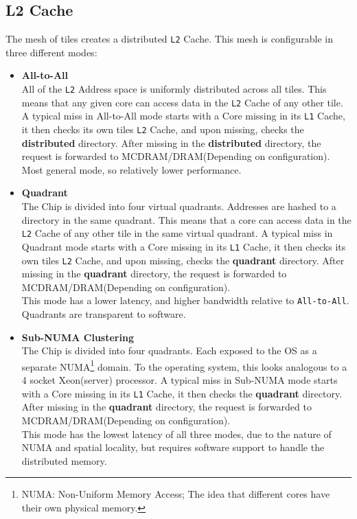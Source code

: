 \documentclass[bsc,frontabs,twoside,singlespacing,parskip,deptreport]{infthesis}     %
\begin{document}
\subsection{L2 Cache}
The mesh of tiles creates a distributed \texttt{L2} Cache. This mesh is configurable in three different modes:
\begin{itemize}

    \item \textbf{All-to-All} \\
    All of the \texttt{L2} Address space is uniformly distributed across all tiles. This means that any given core can access data in the \texttt{L2} Cache of any other tile. A typical miss in All-to-All mode starts with a Core missing in its \texttt{L1} Cache, it then checks its own tiles \texttt{L2} Cache, and upon missing, checks the \textbf{distributed} directory. After missing in the \textbf{distributed} directory, the request is forwarded to MCDRAM/DRAM(Depending on configuration).\\
    Most general mode, so relatively lower performance.
    
    \item \textbf{Quadrant} \\
    The Chip is divided into four virtual quadrants. Addresses are hashed to a directory in the same quadrant. This means that a core can access data in the \texttt{L2} Cache of any other tile in the same virtual quadrant. A typical miss in Quadrant mode starts with a Core missing in its \texttt{L1} Cache, it then checks its own tiles \texttt{L2} Cache, and upon missing, checks the \textbf{quadrant} directory. After missing in the \textbf{quadrant} directory, the request is forwarded to MCDRAM/DRAM(Depending on configuration).\\
    This mode has a lower latency, and higher bandwidth relative to \texttt{All-to-All}. Quadrants are transparent to software.
    
    \item \textbf{Sub-NUMA Clustering}\label{snc4-explained} \\
    The Chip is divided into four quadrants. Each exposed to the OS as a separate NUMA\footnote{NUMA: Non-Uniform Memory Access; The idea that different cores have their own physical memory.} domain. To the operating system, this looks analogous to a 4 socket Xeon(server) processor. A typical miss in Sub-NUMA mode starts with a Core missing in its \texttt{L1} Cache, it then checks the \textbf{quadrant} directory. After missing in the \textbf{quadrant} directory, the request is forwarded to MCDRAM/DRAM(Depending on configuration). \\
    This mode has the lowest latency of all three modes, due to the nature of NUMA and spatial locality, but requires software support to handle the distributed memory.
    
\end{itemize}
\end{document}
